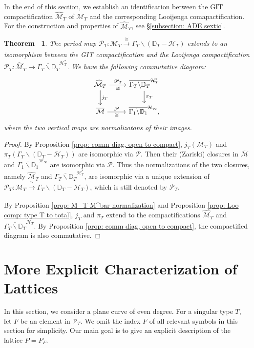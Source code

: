 \documentclass[12pt,reqno,a4paper]{amsart}
\newtheorem{thm}{Theorem~}[section]
\theoremstyle{remark}
\theoremstyle{definition}
\newcommand{\DD}{\mathbb{D}}
\newcommand{\Prd}{\mathscr{P}}
\newcommand{\calH}{\mathcal{H}}
\newcommand{\calM}{\mathcal{M}}
\newcommand{\calV}{\mathcal{V}}
\newcommand{\bs}{\backslash}
\begin{document}
In the end of this section, we establish an identification between the GIT compactification $\widehat{\calM}_T$ of $\calM_T$ and the corresponding Looijenga comapactification.
For the construction and properties of $\widehat{\calM}_T$, see \S \ref{subsection: ADE sextic}.
\begin{thm}
\label{thm: comm diag, compact to compact}
    The period map $\Prd_T\colon\calM_T\xrightarrow[]{\cong}\Gamma_T\bs(\DD_T-\calH_T)$ extends to an isomorphism between the GIT compactification and the Looijenga compactification $\Prd_T\colon \widehat{\calM}_T\to\overline{\Gamma_T\bs\DD_T}^{\calH_T^*}$.
    We have the following commutative diagram:
    \begin{equation*}
    \begin{tikzcd}
      \widehat{\calM}_T \arrow[r,"\Prd_T","\cong"'] \arrow[d,"j_T"] & \overline{\Gamma_T\bs\DD_T}^{\calH_T^*} \arrow[d,"\pi_T"] \\
      \overline{\calM} \arrow[r,"\Prd","\cong"'] & \overline{\Gamma_1\bs\DD_1}^{\calH_\infty},
    \end{tikzcd}
    \end{equation*}
    where the two vertical maps are normalizatons of their images.
\end{thm}
\begin{proof}
    By Proposition \ref{prop: comm diag, open to compact}, $j_T(\calM_T)$ and $\pi_T(\Gamma_T\bs(\DD_T-\calH_T))$ are isomorphic via $\Prd$.
    Then their (Zariski) closures in $\overline{\calM}$ and $\overline{\Gamma_1\bs\DD_1}^{\calH_\infty}$ are isomorphic via $\Prd$.
    Thus the normalizations of the two closures, namely $\widehat{\calM}_T$ and $\overline{\Gamma_T\bs\DD_T}^{\calH_T^*}$, are isomorphic via a unique extension of $\Prd_T\colon\calM_T\xrightarrow[]{\cong}\Gamma_T\bs(\DD_T-\calH_T)$, which is still denoted by $\Prd_T$.
    
    By Proposition \ref{prop: M_T M^bar normalization} and Proposition \ref{prop: Loo comp: type T to total}, $j_T$ and $\pi_T$ extend to the compactifications $\widehat{\calM}_T$ and $\overline{\Gamma_T\bs\DD_T}^{\calH_T}$.
    By Proposition \ref{prop: comm diag, open to compact}, the compactified diagram is also commutative.
\end{proof}
 




\section{More Explicit Characterization of Lattices}
\label{section: explicit description of lattices}
In this section, we consider a plane curve of even degree.
For a singular type $T$, let $F$ be an element in $\calV_T$. 
We omit the index $F$ of all relevant symbols in this section for simplicity. 
Our main goal is to give an explicit description of the lattice $P=P_F$.
\end{document}
